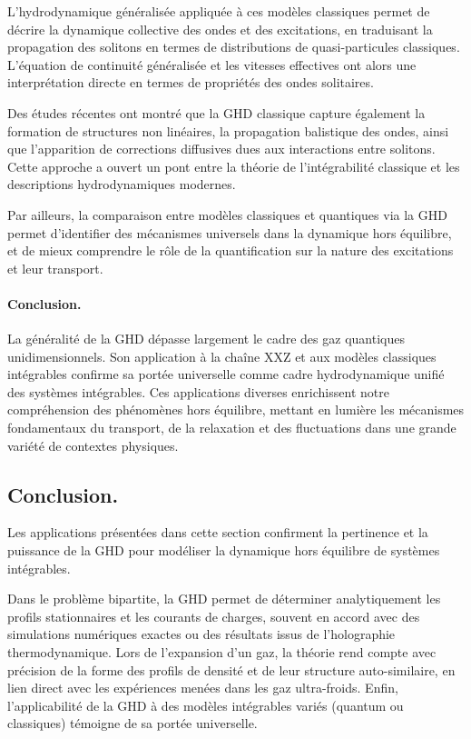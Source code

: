 L’hydrodynamique généralisée appliquée à ces modèles classiques permet de décrire la dynamique collective des ondes et des excitations, en traduisant la propagation des solitons en termes de distributions de quasi-particules classiques. L’équation de continuité généralisée et les vitesses effectives ont alors une interprétation directe en termes de propriétés des ondes solitaires.

Des études récentes ont montré que la GHD classique capture également la formation de structures non linéaires, la propagation balistique des ondes, ainsi que l’apparition de corrections diffusives dues aux interactions entre solitons. Cette approche a ouvert un pont entre la théorie de l’intégrabilité classique et les descriptions hydrodynamiques modernes.

Par ailleurs, la comparaison entre modèles classiques et quantiques via la GHD permet d’identifier des mécanismes universels dans la dynamique hors équilibre, et de mieux comprendre le rôle de la quantification sur la nature des excitations et leur transport.

\paragraph{Conclusion.}
La généralité de la GHD dépasse largement le cadre des gaz quantiques unidimensionnels. Son application à la chaîne XXZ et aux modèles classiques intégrables confirme sa portée universelle comme cadre hydrodynamique unifié des systèmes intégrables. Ces applications diverses enrichissent notre compréhension des phénomènes hors équilibre, mettant en lumière les mécanismes fondamentaux du transport, de la relaxation et des fluctuations dans une grande variété de contextes physiques.


\subsection*{Conclusion.}
Les applications présentées dans cette section confirment la pertinence et la puissance de la GHD pour modéliser la dynamique hors équilibre de systèmes intégrables.

Dans le problème bipartite, la GHD permet de déterminer analytiquement les profils stationnaires et les courants de charges, souvent en accord avec des simulations numériques exactes ou des résultats issus de l’holographie thermodynamique. Lors de l’expansion d’un gaz, la théorie rend compte avec précision de la forme des profils de densité et de leur structure auto-similaire, en lien direct avec les expériences menées dans les gaz ultra-froids. Enfin, l’applicabilité de la GHD à des modèles intégrables variés (quantum ou classiques) témoigne de sa portée universelle.

